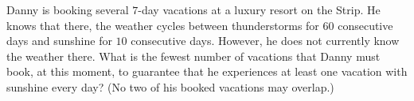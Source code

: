 Danny is booking several $7$-day vacations at a luxury resort on the Strip. He knows that there, the weather cycles between thunderstorms for $60$ consecutive days and sunshine for $10$ consecutive days. However, he does not currently know the weather there. What is the fewest number of vacations that Danny must book, at this moment, to guarantee that he experiences at least one vacation with sunshine every day? (No two of his booked vacations may overlap.)

